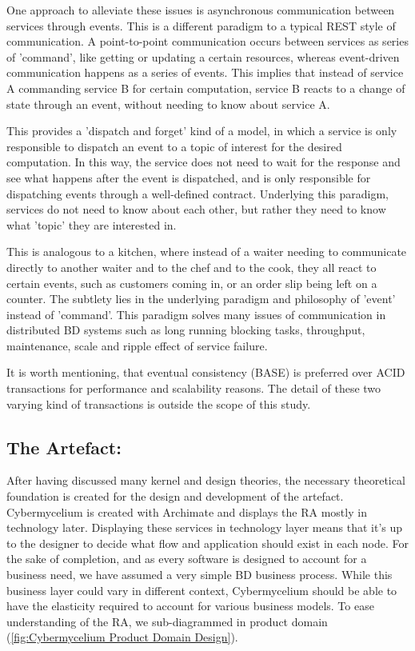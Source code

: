 \documentclass[review]{elsarticle}
\begin{document}
One approach to alleviate these issues is asynchronous communication between services through events. This is a different paradigm to a typical REST style of communication. A point-to-point communication occurs between services as series of 'command', like getting or updating a certain resources, whereas event-driven communication happens as a series of events. This implies that instead of service A commanding service B for certain computation, service B reacts to a change of state through an event, without needing to know about service A.

This provides a 'dispatch and forget' kind of a model, in which a service is only responsible to dispatch an event to a topic of interest for the desired computation. In this way, the service does not need to wait for the response and see what happens after the event is dispatched, and is only responsible for dispatching events through a well-defined contract. Underlying this paradigm, services do not need to know about each other, but rather they need to know what 'topic' they are interested in.

This is analogous to a kitchen, where instead of a waiter needing to communicate directly to another waiter and to the chef and to the cook, they all react to certain events, such as customers coming in, or an order slip being left on a counter. The subtlety lies in the underlying paradigm and philosophy of 'event' instead of 'command'. This paradigm solves many issues of communication in distributed BD systems such as long running blocking tasks, throughput, maintenance, scale and ripple effect of service failure.

It is worth mentioning, that eventual consistency (BASE) is preferred over ACID transactions for performance and scalability reasons. The detail of these two varying kind of transactions is outside the scope of this study.

\subsection{The Artefact:}

After having discussed many kernel and design theories, the necessary theoretical foundation is created for the design and development of the artefact. Cybermycelium is created with Archimate and displays the RA mostly in technology later. Displaying these services in technology layer means that it's up to the designer to decide what flow and application should exist in each node. For the sake of completion, and as every software is designed to account for a business need, we have assumed a very simple BD business process. While this business layer could vary in different context, Cybermycelium should be able to have the elasticity required to account for various business models. To ease understanding of the RA, we sub-diagrammed in product domain (\ref{fig:Cybermycelium Product Domain Design}).
\end{document}
